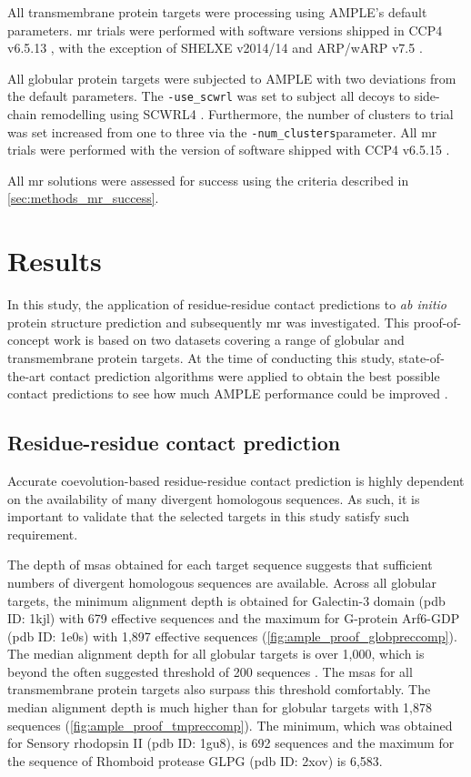 All transmembrane protein targets were processing using AMPLE's default parameters. \Gls{mr} trials were performed with software versions shipped in CCP4 v6.5.13 \cite{Winn2011-xe}, with the exception of SHELXE v2014/14 \cite{Thorn2013-le} and ARP/wARP v7.5 \cite{Cohen2007-wg}.

All globular protein targets were subjected to AMPLE with two deviations from the default parameters. The \texttt{-use\_scwrl} was set to subject all decoys to side-chain remodelling using SCWRL4 \cite{Krivov2009-ex}. Furthermore, the number of clusters to trial was set increased from one to three via the \texttt{-num\_clusters}parameter. All \gls{mr} trials were performed with the version of software shipped with CCP4 v6.5.15 \cite{Winn2011-xe}.

All \gls{mr} solutions were assessed for success using the criteria described in \cref{sec:methods_mr_success}.

\section{Results}
In this study, the application of residue-residue contact predictions to \textit{ab initio} protein structure prediction and subsequently \gls{mr} was investigated. This proof-of-concept work is based on two datasets covering a range of globular and transmembrane protein targets. At the time of conducting this study, state-of-the-art contact prediction algorithms were applied to obtain the best possible contact predictions to see how much AMPLE performance could be improved \cite{Bibby2012-lm}.

\subsection{Residue-residue contact prediction}
Accurate coevolution-based residue-residue contact prediction is highly dependent on the availability of many divergent homologous sequences. As such, it is important to validate that the selected targets in this study satisfy such requirement.

The depth of \gls{msa}s obtained for each target sequence suggests that sufficient numbers of divergent homologous sequences are available. Across all globular targets, the minimum alignment depth is obtained for Galectin-3 domain (\gls{pdb} ID: 1kjl) with 679 effective sequences and the maximum for G-protein Arf6-GDP (\gls{pdb} ID: 1e0s) with 1,897 effective sequences (\cref{fig:ample_proof_globpreccomp}). The median alignment depth for all globular targets is over 1,000, which is beyond the often suggested threshold of 200 sequences \cite{Simkovic2017-xs}. The \gls{msa}s for all transmembrane protein targets also surpass this threshold comfortably. The median alignment depth is much higher than for globular targets with 1,878 sequences (\cref{fig:ample_proof_tmpreccomp}). The minimum, which was obtained for Sensory rhodopsin II (\gls{pdb} ID: 1gu8), is 692 sequences and the maximum for the sequence of Rhomboid protease GLPG (\gls{pdb} ID: 2xov) is 6,583.

